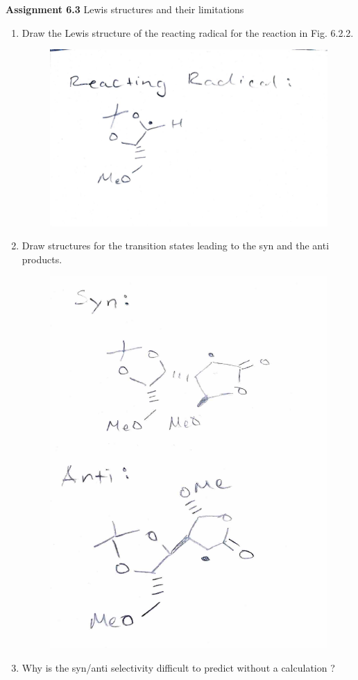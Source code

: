 \documentclass{article}
\begin{document}
\textbf{Assignment 6.3}
Lewis structures and their limitations

\begin{enumerate}
	\item Draw the Lewis structure of the reacting radical for the reaction in Fig. 6.2.2.
		\begin{figure}[h]
			\centering
			\includegraphics[width=\textwidth]{reacting-radical.pdf}
		\end{figure}
	\item Draw structures for the transition states leading to the syn and the anti products.
		\begin{figure}[h]
			\centering
			\includegraphics[width=\textwidth]{syn-anti.pdf}
		\end{figure}

	\item Why is the syn/anti selectivity difficult to predict without a calculation ?
\end{enumerate}

\enddocument
\end{document}
